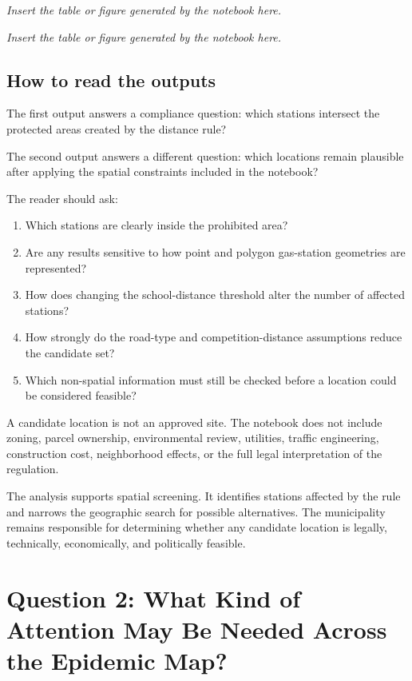 \documentclass[11pt]{article}
\newcommand{\outputplaceholder}[1]{%
\begin{tcolorbox}[
  colback=white,
  colframe=black!30,
  title=Colab output: #1,
  fonttitle=\bfseries
]
\centering
\vspace{1.2cm}
\textit{Insert the table or figure generated by the notebook here.}
\vspace{1.2cm}
\end{tcolorbox}
}
\begin{document}
\outputplaceholder{Gas stations affected by the school-distance rule}

\outputplaceholder{Screened relocation candidates}

\subsection{How to read the outputs}

The first output answers a compliance question: which stations intersect the protected areas created by the distance rule?

The second output answers a different question: which locations remain plausible after applying the spatial constraints included in the notebook?

The reader should ask:

\begin{enumerate}[leftmargin=*]
    \item Which stations are clearly inside the prohibited area?
    \item Are any results sensitive to how point and polygon gas-station geometries are represented?
    \item How does changing the school-distance threshold alter the number of affected stations?
    \item How strongly do the road-type and competition-distance assumptions reduce the candidate set?
    \item Which non-spatial information must still be checked before a location could be considered feasible?
\end{enumerate}

\begin{validationbox}
A candidate location is not an approved site. The notebook does not include zoning, parcel ownership, environmental review, utilities, traffic engineering, construction cost, neighborhood effects, or the full legal interpretation of the regulation.
\end{validationbox}

\begin{decisionbox}
The analysis supports spatial screening. It identifies stations affected by the rule and narrows the geographic search for possible alternatives. The municipality remains responsible for determining whether any candidate location is legally, technically, economically, and politically feasible.
\end{decisionbox}


\section{Question 2: What Kind of Attention May Be Needed Across the Epidemic Map?}
\end{document}
